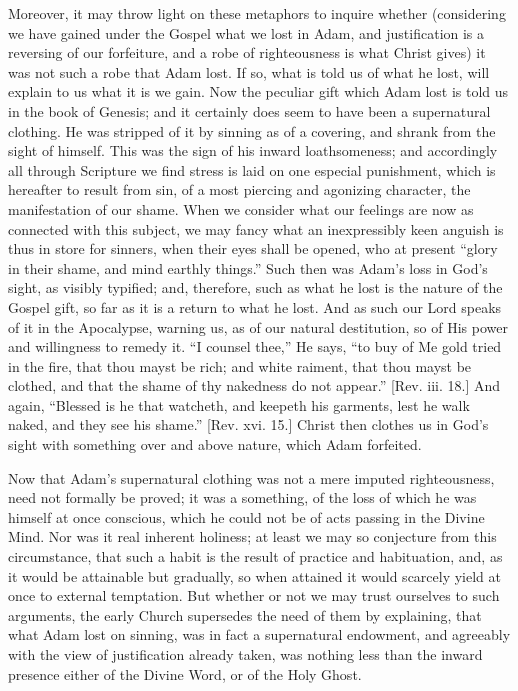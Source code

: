 Moreover, it may throw light on these metaphors to inquire whether
(considering we have gained under the Gospel what we lost in Adam, and
justification is a reversing of our forfeiture, and a robe of
righteousness is what Christ gives) it was not such a robe that Adam
lost. If so, what is told us of what he lost, will explain to us what
it is we gain. Now the peculiar gift which Adam lost is told us in the
book of Genesis; and it certainly does seem to have been a
supernatural clothing. He was stripped of it by sinning as of a
covering, and shrank from the sight of himself. This was the sign of
his inward loathsomeness; and accordingly all through Scripture we
find stress is laid on one especial punishment, which is hereafter to
result from sin, of a most piercing and agonizing character, the
manifestation of our shame. When we consider what our feelings are now as connected with this subject, we may fancy what an
inexpressibly keen anguish is thus in store for sinners, when their
eyes shall be opened, who at present ``glory in their shame, and
mind earthly things.'' Such then was Adam's loss in God's sight,
as visibly typified; and, therefore, such as what he lost is the
nature of the Gospel gift, so far as it is a return to what he lost.
And as such our Lord speaks of it in the Apocalypse, warning us, as of
our natural destitution, so of His power and willingness to remedy it.
``I counsel thee,'' He says, ``to buy of Me gold tried in
the fire, that thou mayst be rich; and white raiment, that thou mayst
be clothed, and that the shame of thy nakedness do not appear.''
[Rev. iii. 18.] And again, ``Blessed is he that watcheth, and
keepeth his garments, lest he walk naked, and they see his
shame.'' [Rev. xvi. 15.] Christ then clothes us in God's sight
with something over and above nature, which Adam forfeited.

Now that Adam's supernatural clothing was not a mere imputed
righteousness, need not formally be proved; it was a something, of the
loss of which he was himself at once conscious, which he could not be
of acts passing in the Divine Mind. Nor was it real inherent holiness;
at least we may so conjecture from this circumstance, that such a
habit is the result of practice and habituation, and, as it would be
attainable but gradually, so when attained it would scarcely yield at
once to external temptation. But whether or not we may trust ourselves
to such arguments, the early Church supersedes the need of them by
explaining, that what Adam lost on sinning, was in fact a
supernatural endowment, and agreeably with the view of justification
already taken, was nothing less than the inward presence either of the
Divine Word, or of the Holy Ghost.

